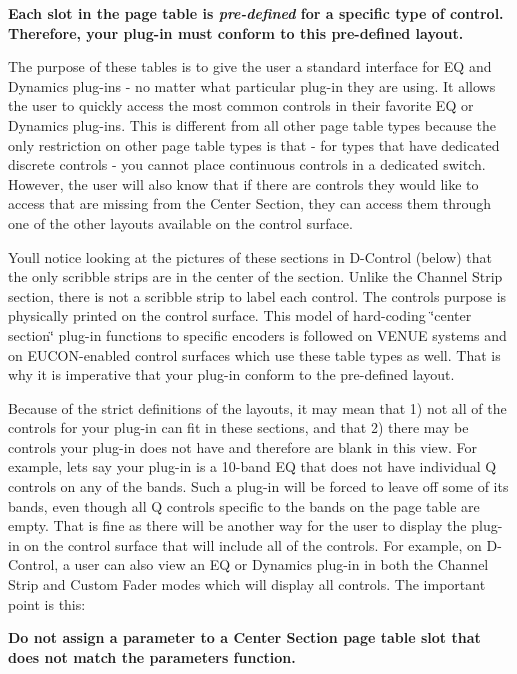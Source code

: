  {\bfseries  Each slot in the page table is {\itshape pre-\/defined} for a specific type of control. Therefore, your plug-\/in must conform to this pre-\/defined layout.} 

The purpose of these tables is to give the user a standard interface for E\+Q and Dynamics plug-\/ins -\/ no matter what particular plug-\/in they are using. It allows the user to quickly access the most common controls in their favorite E\+Q or Dynamics plug-\/ins. This is different from all other page table types because the only restriction on other page table types is that -\/ for types that have dedicated discrete controls -\/ you cannot place continuous controls in a dedicated switch. However, the user will also know that if there are controls they would like to access that are missing from the Center Section, they can access them through one of the other layouts available on the control surface.

You\textquotesingle{}ll notice looking at the pictures of these sections in D-\/\+Control (below) that the only scribble strips are in the center of the section. Unlike the Channel Strip section, there is not a scribble strip to label each control. The control\textquotesingle{}s purpose is physically printed on the control surface. This model of hard-\/coding \char`\"{}center section\char`\"{} plug-\/in functions to specific encoders is followed on V\+E\+N\+U\+E systems and on E\+U\+C\+O\+N-\/enabled control surfaces which use these table types as well. That is why it is imperative that your plug-\/in conform to the pre-\/defined layout.

Because of the strict definitions of the layouts, it may mean that 1) not all of the controls for your plug-\/in can fit in these sections, and that 2) there may be controls your plug-\/in does not have and therefore are blank in this view. For example, let\textquotesingle{}s say your plug-\/in is a 10-\/band E\+Q that does not have individual Q controls on any of the bands. Such a plug-\/in will be forced to leave off some of its bands, even though all Q controls specific to the bands on the page table are empty. That is fine as there will be another way for the user to display the plug-\/in on the control surface that will include all of the controls. For example, on D-\/\+Control, a user can also view an E\+Q or Dynamics plug-\/in in both the Channel Strip and Custom Fader modes which will display all controls. The important point is this\+:

 {\bfseries  Do not assign a parameter to a Center Section page table slot that does not match the parameter\textquotesingle{}s function.} 

